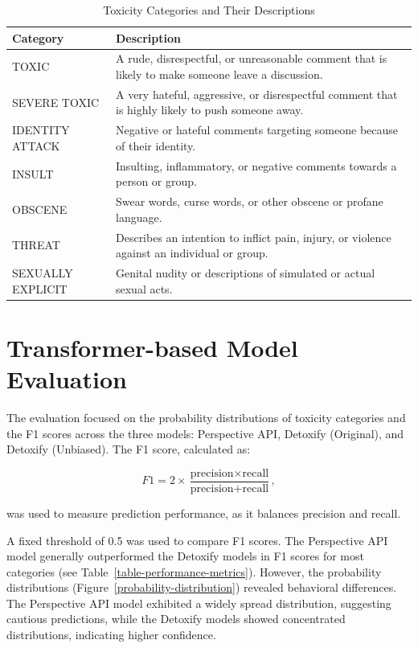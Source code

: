 \begin{table}[tb]
    \centering\small
    \renewcommand{\arraystretch}{1.3}
    \begin{tabularx}{\textwidth}{lX}
        \toprule
        \textbf{Category} & \textbf{Description} \\
        \midrule
        TOXIC & A rude, disrespectful, or unreasonable comment that is likely to make someone leave a discussion. \\
        SEVERE TOXIC & A very hateful, aggressive, or disrespectful comment that is highly likely to push someone away. \\
        IDENTITY ATTACK & Negative or hateful comments targeting someone because of their identity. \\
        INSULT & Insulting, inflammatory, or negative comments towards a person or group. \\
        OBSCENE & Swear words, curse words, or other obscene or profane language. \\
        THREAT & Describes an intention to inflict pain, injury, or violence against an individual or group. \\
        SEXUALLY EXPLICIT & Genital nudity or descriptions of simulated or actual sexual acts. \\
        \bottomrule
    \end{tabularx}
    \caption{Toxicity Categories and Their Descriptions}
    \label{toxicity-categories}
\end{table}

\section{Transformer-based Model Evaluation} \label{evaluation}
The evaluation focused on the probability distributions of toxicity categories and the F1 scores across the three models: Perspective API, Detoxify (Original), and Detoxify (Unbiased). The F1 score, calculated as:

\[
F1 = 2 \times \frac{\text{precision} \times \text{recall}}{\text{precision} + \text{recall}},
\]

was used to measure prediction performance, as it balances precision and recall.

A fixed threshold of 0.5 was used to compare F1 scores. The Perspective API model generally outperformed the Detoxify models in F1 scores for most categories (see Table~\ref{table-performance-metrics}). However, the probability distributions (Figure~\ref{probability-distribution}) revealed behavioral differences. The Perspective API model exhibited a widely spread distribution, suggesting cautious predictions, while the Detoxify models showed concentrated distributions, indicating higher confidence.

